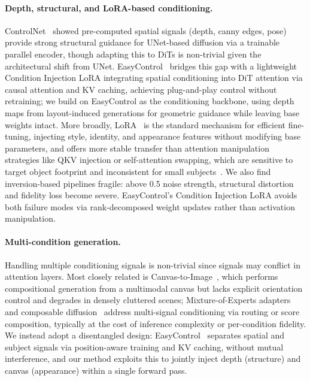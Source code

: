 \documentclass[runningheads]{llncs}
\begin{document}
\paragraph{Depth, structural, and LoRA-based conditioning.}
ControlNet~\cite{zhang2023adding} showed pre-computed spatial signals (depth, canny edges, pose) provide strong structural guidance for UNet-based diffusion via a trainable parallel encoder, though adapting this to DiTs is non-trivial given the architectural shift from UNet.
EasyControl~\cite{zhang2025easycontrol} bridges this gap with a lightweight Condition Injection LoRA integrating spatial conditioning into DiT attention via causal attention and KV caching, achieving plug-and-play control without retraining; we build on EasyControl as the conditioning backbone, using depth maps from layout-induced generations for geometric guidance while leaving base weights intact.
More broadly, LoRA~\cite{hu2022lora} is the standard mechanism for efficient fine-tuning, injecting style, identity, and appearance features without modifying base parameters, and offers more stable transfer than attention manipulation strategies like QKV injection or self-attention swapping, which are sensitive to target object footprint and inconsistent for small subjects~\cite{hertz2022prompt, mokady2023null, tumanyan2023plug}.
We also find inversion-based pipelines fragile: above 0.5 noise strength, structural distortion and fidelity loss become severe.
EasyControl's Condition Injection LoRA avoids both failure modes via rank-decomposed weight updates rather than activation manipulation.

\paragraph{Multi-condition generation.}
Handling multiple conditioning signals is non-trivial since signals may conflict in attention layers.
Most closely related is Canvas-to-Image~\cite{dalva2025canvastoimage}, which performs compositional generation from a multimodal canvas but lacks explicit orientation control and degrades in densely cluttered scenes; Mixture-of-Experts adapters~\cite{wu2024mole} and composable diffusion~\cite{liu2022compositional} address multi-signal conditioning via routing or score composition, typically at the cost of inference complexity or per-condition fidelity.
We instead adopt a disentangled design: EasyControl~\cite{zhang2025easycontrol} separates spatial and subject signals via position-aware training and KV caching, without mutual interference, and our method exploits this to jointly inject depth (structure) and canvas (appearance) within a single forward pass.
\end{document}
